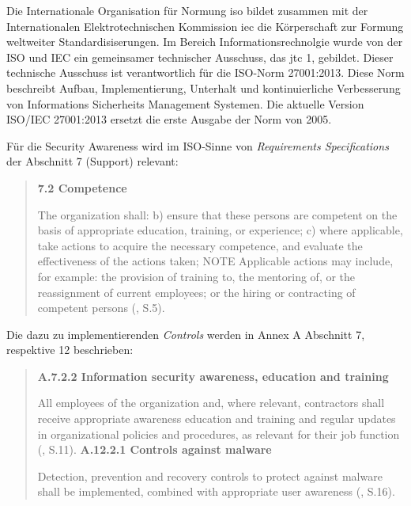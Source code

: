 \documentclass[../../main.tex]{subfiles}
\begin{document}
\begin{sloppypar}
Die Internationale Organisation für Normung \acrshort{iso} bildet zusammen mit der Internationalen Elektrotechnischen Kommission \acrshort{iec} die Körperschaft zur Formung weltweiter Standardisiserungen. Im Bereich Informationsrechnolgie wurde von der ISO und IEC ein gemeinsamer technischer Ausschuss, das \acrshort{jtc} 1, gebildet. Dieser technische Ausschuss ist verantwortlich für die ISO-Norm 27001:2013. Diese Norm beschreibt Aufbau, Implementierung, Unterhalt und kontinuierliche Verbesserung von Informations Sicherheits Management Systemen. Die aktuelle Version ISO/IEC 27001:2013 ersetzt die erste Ausgabe der Norm von 2005.

Für die Security Awareness wird im ISO-Sinne von \textit{Requirements Specifications} der Abschnitt 7 (Support) relevant:

\begin{quote}
\textbf{7.2 Competence}\newline

The organization shall:\newline
b) ensure that these persons are competent on the basis of appropriate education, training, or experience;\newline
c) where applicable, take actions to acquire the necessary competence, and evaluate the effectiveness
of the actions taken;\newline
\newline
NOTE Applicable actions may include, for example: the provision of training to, the mentoring of, or the reassignment
of current employees; or the hiring or contracting of competent persons (\cite{iso/iec_jtc_1_iso/iec_2013}, S.5).
\end{quote}

Die dazu zu implementierenden \textit{Controls} werden in Annex A Abschnitt 7, respektive 12 beschrieben:

\begin{quote}
\textbf{A.7.2.2 Information security awareness, education and training}\newline

All employees of the organization and, where relevant, contractors shall receive appropriate awareness education and training and regular updates in organizational policies and procedures, as relevant for their job function (\cite{iso/iec_jtc_1_iso/iec_2013}, S.11).
\newline
\newline
\textbf{A.12.2.1 Controls against malware}\newline

Detection, prevention and recovery controls to protect against malware shall be implemented, combined with appropriate user awareness (\cite{iso/iec_jtc_1_iso/iec_2013}, S.16).
\end{quote}

\end{sloppypar}
\end{document}

